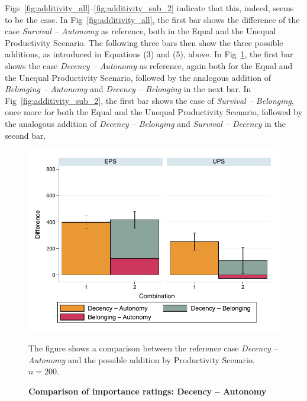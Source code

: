 \documentclass[10pt,letterpaper]{article}
\begin{document}
Figs~\ref{fig:additivity_all}--\ref{fig:additivity_sub_2} indicate that this, indeed, seems to be the case.
In Fig~\ref{fig:additivity_all}, the first bar shows the difference of the case \textit{Survival -- Autonomy} as reference, both in the Equal and the Unequal Productivity Scenario.
The following three bars then show the three possible additions, as introduced in Equations (3) and (5), above.
In Fig~\ref{fig:additivity_sub_1}, the first bar shows the case \textit{Decency -- Autonomy} as reference, again both for the Equal and the Unequal Productivity Scenario, followed by the analogous addition of \textit{Belonging -- Autonomy} and \textit{Decency -- Belonging} in the next bar.
In Fig~\ref{fig:additivity_sub_2}, the first bar shows the case of \textit{Survival -- Belonging}, once more for both the Equal and the Unequal Productivity Scenario, followed by the analogous addition of \textit{Decency -- Belonging} and \textit{Survival -- Decency} in the second bar.

\begin{figure}[t!]
   \includegraphics[width=\textwidth]{figures/figure_7.pdf}
   \caption{\bf Comparison of importance ratings: Decency -- Autonomy}
   The figure shows a comparison between the reference case \textit{Decency -- Autonomy} and the possible addition by Productivity Scenario. $n=200$.
   \label{fig:additivity_sub_1}
\end{figure}
\end{document}
